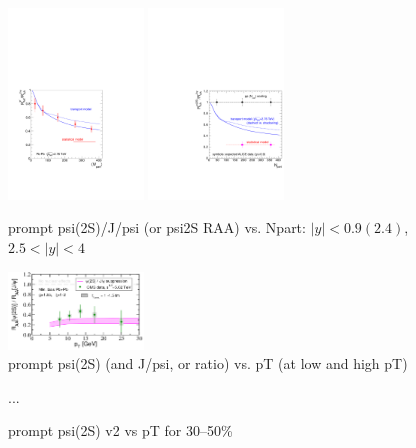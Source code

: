 \documentclass[../report.tex]{subfiles}
\begin{document}
\begin{figure}
\begin{center}
 \includegraphics[width=0.32\textwidth]{fig/alice/alice_dr_psi_projected}
 \includegraphics[width=0.32\textwidth]{fig/alice/alice_dr_psi_projected2}
\end{center}

 \caption{prompt psi(2S)/J/psi (or psi2S RAA) vs. Npart: $|y|<0.9 (2.4)$, $2.5<|y|<4$}
\end{figure}

\begin{figure}
\begin{center}
 \includegraphics[width=0.32\textwidth]{fig/theory/psi_dr_vitev.png}
\end{center}

 \caption{prompt psi(2S) (and J/psi, or ratio) vs. pT (at low and high pT) }
\end{figure}

\begin{figure}
...

 \caption{prompt psi(2S) v2 vs pT for 30--50\%}
\end{figure}
\end{document}
